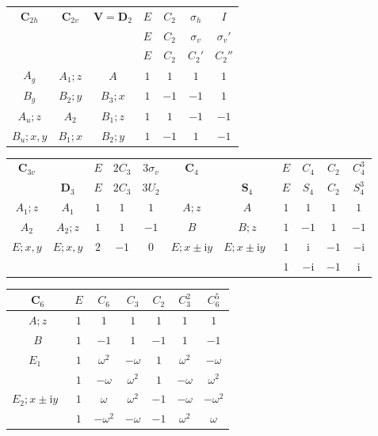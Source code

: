 \begin{center}
\renewcommand{\arraystretch}{1.3}%
\begin{tabular}{ccc|cccc}
  $\boldsymbol{C}_{2h}$ & $\boldsymbol{C}_{2v}$ & $\boldsymbol{V}=\boldsymbol{D}_2$
  & $E$ & $C_2$ & $\sigma_h$ & $I$\\
  & & & $E$ & $C_2$ & $\sigma_v$ & $\sigma_v'$\\
  & & & $E$ & $C_2$ & $C_2'$ & $C_2''$\\
  \hline
  $A_g$ & $A_1;z$ & $A$ & $1$ & $1$ & $1$ & $1$\\
  $B_g$ & $B_2;y$ & $B_3;x$ & $1$ & $-1$ & $-1$ & $1$\\
  $A_u;z$ & $A_2$ & $B_1;z$ & $1$ & $1$ & $-1$ & $-1$\\
  $B_u;x,y$ & $B_1;x$ & $B_2;y$ & $1$ & $-1$ & $1$ & $-1$\\
\end{tabular}

\vspace{1.2em}

\begin{tabular}{cc|ccc@{\qquad}c@{\quad}c|cccc}
  $\boldsymbol{C}_{3v}$ & & $E$ & $2C_3$ & $3\sigma_v$
  & $\boldsymbol{C}_4$ & & $E$ & $C_4$ & $C_2$ & $C_4^3$\\
  & $\boldsymbol{D}_3$ & $E$ & $2C_3$ & $3U_2$
  & & $\boldsymbol{S}_4$ & $E$ & $S_4$ & $C_2$ & $S_4^3$\\
  \hline
  $A_1;z$ & $A_1$ & $1$ & $1$ & $1$
  & $A;z$ & $A$ & $1$ & $1$ & $1$ & $1$\\
  $A_2$ & $A_2;z$ & $1$ & $1$ & $-1$
  & $B$ & $B;z$
  & $1$ & $-1$ & $1$ & $-1$\\
  $E;x,y$ & $E;x,y$ & $2$ & $-1$ & $0$
  & $E;x\pm\mathrm{i}y$ & $E;x\pm\mathrm{i}y$\ \smash{\raisebox{-0.25em}{$\left.\rule{0pt}{2.1em}\right\}$}}
  & $1$ & $\mathrm{i}$ & $-1$ & $-\mathrm{i}$\\
  & & & & & & & $1$ & $-\mathrm{i}$ & $-1$ & $\mathrm{i}$\\
\end{tabular}

\vspace{1.2em}

\begin{tabular}{c|cccccc}
  $\boldsymbol{C}_6$ & $E$ & $C_6$ & $C_3$ & $C_2$ & $C_3^2$ & $C_6^5$\\
  \hline
  $A;z$ & $1$ & $1$ & $1$ & $1$ & $1$ & $1$\\
  $B$ & $1$ & $-1$ & $1$ & $-1$ & $1$ & $-1$\\
  $E_1$\ \smash{\raisebox{0.45em}{$\Bigg\}$}}
    & $1$ & $\omega^2$ & $-\omega$ & $1$ & $\omega^2$ & $-\omega$\\
  & $1$ & $-\omega$ & $\omega^2$ & $1$ & $-\omega$ & $\omega^2$\\
  $E_2;x\pm\mathrm{i}y$\ \smash{\raisebox{0.45em}{$\Bigg\}$}}
    & $1$ & $\omega$ & $\omega^2$ & $-1$ & $-\omega$ & $-\omega^2$\\
  & $1$ & $-\omega^2$ & $-\omega$ & $-1$ & $\omega^2$ & $\omega$\\
\end{tabular}


\end{center}
